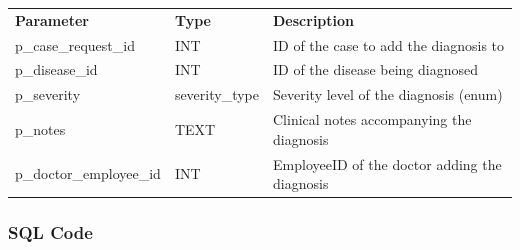 \documentclass{article}
\newcommand{\theadcell}{\color{white}\bfseries}
\begin{document}
\begin{center}
\begin{tabular}{L{4.5cm} L{2.5cm} L{6.5cm}}
   \theadcell Parameter & \theadcell Type & \theadcell Description \\
   p\_case\_request\_id   & INT           & ID of the case to add the diagnosis to \\
   p\_disease\_id         & INT           & ID of the disease being diagnosed \\
   p\_severity            & severity\_type & Severity level of the diagnosis (enum) \\
   p\_notes              & TEXT          & Clinical notes accompanying the diagnosis \\
   p\_doctor\_employee\_id & INT           & EmployeeID of the doctor adding the diagnosis \\
\end{tabular}
\end{center}

\subsubsection{SQL Code}
\end{document}
